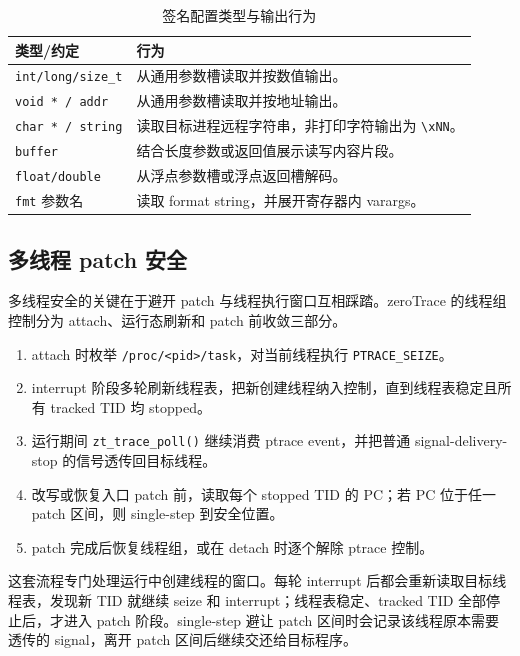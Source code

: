 \documentclass[UTF8,a4paper,11pt,fontset=fandol]{ctexart}
\newcommand{\code}[1]{\texttt{#1}}
\begin{document}
\begin{table}[H]
\centering
\caption{签名配置类型与输出行为}
\label{tab:sigconf}
\begin{tabularx}{\textwidth}{P{3.2cm}Y}
\toprule
\textbf{类型/约定} & \textbf{行为}\\
\midrule
\code{int/long/size\_t} & 从通用参数槽读取并按数值输出。\\
\code{void * / addr} & 从通用参数槽读取并按地址输出。\\
\code{char * / string} & 读取目标进程远程字符串，非打印字符输出为 \code{\textbackslash xNN}。\\
\code{buffer} & 结合长度参数或返回值展示读写内容片段。\\
\code{float/double} & 从浮点参数槽或浮点返回槽解码。\\
\code{fmt} 参数名 & 读取 format string，并展开寄存器内 varargs。\\
\bottomrule
\end{tabularx}
\end{table}

\subsection{多线程 patch 安全}

多线程安全的关键在于避开 patch 与线程执行窗口互相踩踏。zeroTrace 的线程组控制分为 attach、运行态刷新和 patch 前收敛三部分。

\begin{enumerate}[leftmargin=2.4em]
  \item attach 时枚举 \code{/proc/<pid>/task}，对当前线程执行 \code{PTRACE\_SEIZE}。
  \item interrupt 阶段多轮刷新线程表，把新创建线程纳入控制，直到线程表稳定且所有 tracked TID 均 stopped。
  \item 运行期间 \code{zt\_trace\_poll()} 继续消费 ptrace event，并把普通 signal-delivery-stop 的信号透传回目标线程。
  \item 改写或恢复入口 patch 前，读取每个 stopped TID 的 PC；若 PC 位于任一 patch 区间，则 single-step 到安全位置。
  \item patch 完成后恢复线程组，或在 detach 时逐个解除 ptrace 控制。
\end{enumerate}

这套流程专门处理运行中创建线程的窗口。每轮 interrupt 后都会重新读取目标线程表，发现新 TID 就继续 seize 和 interrupt；线程表稳定、tracked TID 全部停止后，才进入 patch 阶段。single-step 避让 patch 区间时会记录该线程原本需要透传的 signal，离开 patch 区间后继续交还给目标程序。
\end{document}
